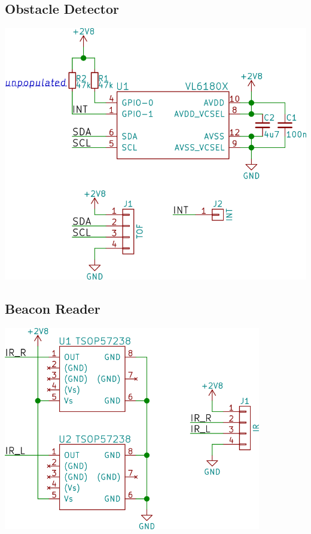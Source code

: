 \documentclass[openbib,letterpaper,10pt]{article}
\begin{document}
\begin{spacing}{1.15}
\begin{appendix}
\subsection{Obstacle Detector}
\begin{center}
\includegraphics[height=30em]{../electronics/locomotive_tof_sensor/images/locomotive_tof_sensor-sch-small.png}
\end{center}

\subsection{Beacon Reader}
\begin{center}
\includegraphics[height=24em]{../electronics/locomotive_ir_receiver/images/locomotive_ir_receiver-sch-small.png}
\end{center}


\end{appendix}
\end{spacing}
\end{document}
